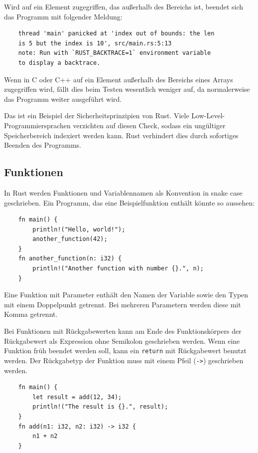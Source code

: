 Wird auf ein Element zugegriffen, das außerhalb des Bereichs ist, beendet sich das Programm mit folgender Meldung:

\begin{lstlisting}
    thread 'main' panicked at 'index out of bounds: the len
    is 5 but the index is 10', src/main.rs:5:13
    note: Run with `RUST_BACKTRACE=1` environment variable
    to display a backtrace.
\end{lstlisting}

Wenn in C oder C++ auf ein Element außerhalb des Bereichs eines Arrays zugegriffen wird, fällt dies beim Testen wesentlich weniger auf, da normalerweise das Programm weiter ausgeführt wird.

Das ist ein Beispiel der Sicherheitsprinzipien von Rust. Viele Low-Level-Pro\-gram\-mier\-spra\-chen verzichten auf diesen Check, sodass ein ungültiger Speicherbereich indexiert werden kann. Rust verhindert dies durch sofortiges Beenden des Programms.

\subsection{Funktionen}

In Rust werden Funktionen und Variablennamen als Konvention in snake case geschrieben. Ein Programm, das eine Beispielfunktion enthält könnte so aussehen:

\begin{lstlisting}
    fn main() {
        println!("Hello, world!");
        another_function(42);
    }
    fn another_function(n: i32) {
        println!("Another function with number {}.", n);
    }
\end{lstlisting}

Eine Funktion mit Parameter enthält den Namen der Variable sowie den Typen mit einem Doppelpunkt getrennt. Bei mehreren Parametern werden diese mit Komma getrennt.

Bei Funktionen mit Rückgabewerten kann am Ende des Funktionskörpers der Rückgabewert als Expression ohne Semikolon geschrieben werden. Wenn eine Funktion früh beendet werden soll, kann ein \verb"return" mit Rückgabewert benutzt werden. Der Rückgabetyp der Funktion muss mit einem Pfeil (\verb"->") geschrieben werden.

\begin{lstlisting}
    fn main() {
        let result = add(12, 34);
        println!("The result is {}.", result);
    }
    fn add(n1: i32, n2: i32) -> i32 {
        n1 + n2
    }
\end{lstlisting}

